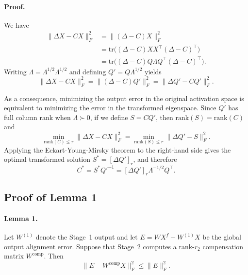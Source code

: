\documentclass[a4paper,fleqn]{cas-dc}
\begin{document}
\paragraph{Proof.}
We have
\begin{align}
\|\Delta X - CX\|_F^2
&= \| (\Delta-C)X \|_F^2 \\
&= \mathrm{tr}\big((\Delta-C)XX^{\top}(\Delta-C)^{\top}\big) \\
&= \mathrm{tr}\big((\Delta-C)Q\Lambda Q^{\top}(\Delta-C)^{\top}\big).
\end{align}
Writing $\Lambda = \Lambda^{1/2}\Lambda^{1/2}$ and defining $Q' = Q\Lambda^{1/2}$ yields
\begin{equation}
\|\Delta X - CX\|_F^2 = \| (\Delta-C)Q' \|_F^2 = \|\Delta Q' - CQ'\|_F^2.
\end{equation}

As a consequence, minimizing the output error in the original activation space is equivalent to minimizing the error in the transformed eigenspace. Since $Q'$ has full column rank when $\Lambda \succ 0$, if we define $S=CQ'$, then $\mathrm{rank}(S)=\mathrm{rank}(C)$ and
\begin{equation}
\min_{\mathrm{rank}(C)\le r} \|\Delta X - CX\|_F^2
=
\min_{\mathrm{rank}(S)\le r} \|\Delta Q' - S\|_F^2.
\end{equation}
Applying the Eckart-Young-Mirsky theorem to the right-hand side gives the optimal transformed solution $S^*=[\Delta Q']_r$, and therefore
\begin{equation}
C^* = S^*Q'^{-1} = [\Delta Q']_r\Lambda^{-1/2}Q^{\top}.
\end{equation}

\subsection{Proof of Lemma 1}

\paragraph{Lemma 1.}
Let $W^{(1)}$ denote the Stage~1 output and let $E = WX^f - W^{(1)}X$ be the global output alignment error. Suppose that Stage~2 computes a rank-$r_2$ compensation matrix $W^{\mathrm{comp}}$. Then
\begin{equation}
\|E - W^{\mathrm{comp}}X\|_F^2 \le \|E\|_F^2.
\end{equation}
\end{document}
